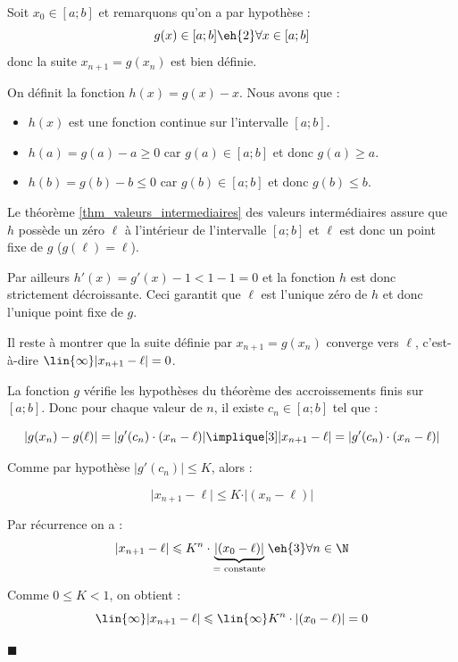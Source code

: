 \medskip
\begin{demonstration}
Soit $x_0\in[a;b]$ et remarquons qu'on a par hypothèse :
$$g(x)\in[a;b]\eh{2} \forall x\in[a;b]$$
donc la suite $x_{n+1}=g(x_n)$ est bien définie.

\medskip
On définit la fonction $h(x)=g(x)-x$. Nous avons que :

\begin{itemize}
\item $h(x)$ est une fonction continue sur l'intervalle $[a;b]$.
\item $h(a)=g(a)-a\geqslant 0$ car $g(a)\in[a;b]$ et donc $g(a)\geqslant a$.
\item $h(b)=g(b)-b\leqslant 0$ car $g(b)\in[a;b]$ et donc $g(b)\leqslant b$.
\end{itemize}

Le théorème \ref*{thm_valeurs_intermediaires} des valeurs intermédiaires assure que $h$ possède un zéro $\ell$ à l'intérieur de l'intervalle $[a;b]$ et $\ell$ est donc un point fixe de $g$ ($g(\ell)=\ell$).

\medskip
Par ailleurs $h'(x)=g'(x)-1< 1-1=0$ et la fonction $h$ est donc strictement décroissante. Ceci garantit que $\ell$ est l'unique zéro de $h$ et donc l'unique point fixe de $g$.

\bigskip
Il reste à montrer que la suite définie par $x_{n+1} = g(x_n)$ converge vers $\ell$, c'est-à-dire $\lin{\infty}\vert x_{n+1}-\ell\vert =0$.

\medskip
La fonction $g$ vérifie les hypothèses du théorème des accroissements finis sur $[a;b]$. Donc pour chaque valeur de $n$, il existe $c_n\in [a;b]$ tel que :

$$\vert g(x_{n})-g(\ell)\vert =\vert g'(c_n)\cdot (x_n-\ell)\vert \implique[3] \vert x_{n+1}-\ell\vert=\vert g'(c_n)\cdot (x_n-\ell)\vert$$


\medskip
Comme par hypothèse $\vert g'(c_n)\vert\leqslant K$, alors :

$$\vert x_{n+1}-\ell\vert \leqslant K\cdot \vert (x_n-\ell) \vert$$

Par récurrence on a : 
$$\vert x_{n+1}-\ell\vert \leqslant K^n\cdot \underbrace{\vert (x_0-\ell)\vert}_{=\textrm{ constante}}  \eh{3}\forall n\in\N$$


Comme $0\leqslant K< 1$, on obtient : 
$$\lin{\infty}  \vert x_{n+1}-\ell\vert \leqslant \lin{\infty}K^n\cdot \vert (x_0-\ell)\vert=0$$

\vspace{-3mm}
\hfill $\blacksquare$
\end{demonstration}

